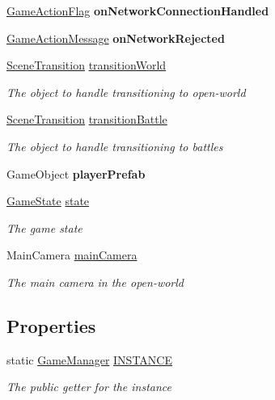 \begin{DoxyCompactItemize}
\item 
\hypertarget{class_game_manager_a87d481fe88a1765f436ea5764cd1a21a}{\hyperlink{class_game_manager_1_1_game_action_flag}{Game\-Action\-Flag} {\bfseries on\-Network\-Connection\-Handled}}\label{class_game_manager_a87d481fe88a1765f436ea5764cd1a21a}

\item 
\hypertarget{class_game_manager_af977df043b83671ab9a4753b90fbf75b}{\hyperlink{class_game_manager_1_1_game_action_message}{Game\-Action\-Message} {\bfseries on\-Network\-Rejected}}\label{class_game_manager_af977df043b83671ab9a4753b90fbf75b}

\item 
\hyperlink{class_scene_transition}{Scene\-Transition} \hyperlink{class_game_manager_a59aeb9d1bcc8580f55f3f4dcdae396fd}{transition\-World}
\begin{DoxyCompactList}\small\item\em The object to handle transitioning to open-\/world \end{DoxyCompactList}\item 
\hyperlink{class_scene_transition}{Scene\-Transition} \hyperlink{class_game_manager_a1bd9eb164a33c054431f5bf8ccc8d3b8}{transition\-Battle}
\begin{DoxyCompactList}\small\item\em The object to handle transitioning to battles \end{DoxyCompactList}\item 
\hypertarget{class_game_manager_a57d400c7a28f42865048fbdbaf236cfb}{Game\-Object {\bfseries player\-Prefab}}\label{class_game_manager_a57d400c7a28f42865048fbdbaf236cfb}

\item 
\hyperlink{class_game_state}{Game\-State} \hyperlink{class_game_manager_a8d86b330237462e38933b28276ed0e2c}{state}
\begin{DoxyCompactList}\small\item\em The game state \end{DoxyCompactList}\item 
Main\-Camera \hyperlink{class_game_manager_aafd6b83529911d9e32cc4b79bd477d74}{main\-Camera}
\begin{DoxyCompactList}\small\item\em The main camera in the open-\/world \end{DoxyCompactList}\end{DoxyCompactItemize}
\subsection*{Properties}
\begin{DoxyCompactItemize}
\item 
static \hyperlink{class_game_manager}{Game\-Manager} \hyperlink{class_game_manager_a5c1d1f77dd4a2668a47a75c934c87075}{I\-N\-S\-T\-A\-N\-C\-E}
\begin{DoxyCompactList}\small\item\em The public getter for the instance \end{DoxyCompactList}\end{DoxyCompactItemize}
